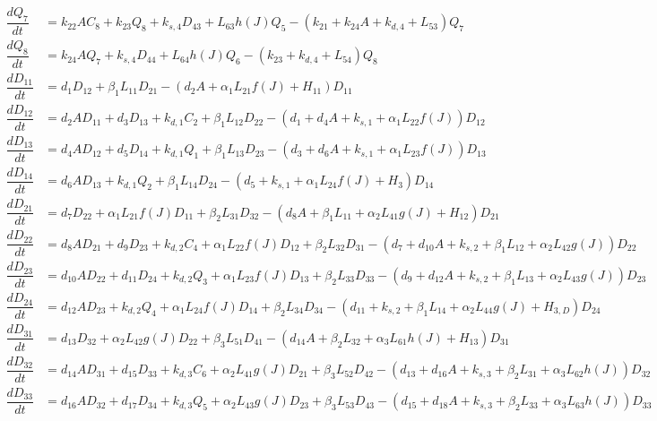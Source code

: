 \begin{align*}
\dfrac{dQ_{7}}{dt} & =k_{22}AC_{8}+k_{23}Q_{8}+k_{s,4}D_{43}+L_{63}h\left(J\right)Q_{5}-\left(k_{21}+k_{24}A+k_{d,4}+L_{53}\right)Q_{7}\\
\dfrac{dQ_{8}}{dt} & =k_{24}AQ_{7}+k_{s,4}D_{44}+L_{64}h\left(J\right)Q_{6}-\left(k_{23}+k_{d,4}+L_{54}\right)Q_{8}\\
\dfrac{dD_{11}}{dt} & =d_{1}D_{12}+\beta_{1}L_{11}D_{21}-\left(d_{2}A+\alpha_{1}L_{21}f\left(J\right)+H_{11}\right)D_{11}\\
\dfrac{dD_{12}}{dt} & =d_{2}AD_{11}+d_{3}D_{13}+k_{d,1}C_{2}+\beta_{1}L_{12}D_{22}-\left(d_{1}+d_{4}A+k_{s,1}+\alpha_{1}L_{22}f\left(J\right)\right)D_{12}\\
\dfrac{dD_{13}}{dt} & =d_{4}AD_{12}+d_{5}D_{14}+k_{d,1}Q_{1}+\beta_{1}L_{13}D_{23}-\left(d_{3}+d_{6}A+k_{s,1}+\alpha_{1}L_{23}f\left(J\right)\right)D_{13}\\
\dfrac{dD_{14}}{dt} & =d_{6}AD_{13}+k_{d,1}Q_{2}+\beta_{1}L_{14}D_{24}-\left(d_{5}+k_{s,1}+\alpha_{1}L_{24}f\left(J\right)+H_{3}\right)D_{14}\\
\dfrac{dD_{21}}{dt} & =d_{7}D_{22}+\alpha_{1}L_{21}f\left(J\right)D_{11}+\beta_{2}L_{31}D_{32}-\left(d_{8}A+\beta_{1}L_{11}+\alpha_{2}L_{41}g\left(J\right)+H_{12}\right)D_{21}\\
\dfrac{dD_{22}}{dt} & =d_{8}AD_{21}+d_{9}D_{23}+k_{d,2}C_{4}+\alpha_{1}L_{22}f\left(J\right)D_{12}+\beta_{2}L_{32}D_{31}-\left(d_{7}+d_{10}A+k_{s,2}+\beta_{1}L_{12}+\alpha_{2}L_{42}g\left(J\right)\right)D_{22}\\
\dfrac{dD_{23}}{dt} & =d_{10}AD_{22}+d_{11}D_{24}+k_{d,2}Q_{3}+\alpha_{1}L_{23}f\left(J\right)D_{13}+\beta_{2}L_{33}D_{33}-\left(d_{9}+d_{12}A+k_{s,2}+\beta_{1}L_{13}+\alpha_{2}L_{43}g\left(J\right)\right)D_{23}\\
\dfrac{dD_{24}}{dt} & =d_{12}AD_{23}+k_{d,2}Q_{4}+\alpha_{1}L_{24}f\left(J\right)D_{14}+\beta_{2}L_{34}D_{34}-\left(d_{11}+k_{s,2}+\beta_{1}L_{14}+\alpha_{2}L_{44}g\left(J\right)+H_{3,D}\right)D_{24}\\
\dfrac{dD_{31}}{dt} & =d_{13}D_{32}+\alpha_{2}L_{42}g\left(J\right)D_{22}+\beta_{3}L_{51}D_{41}-\left(d_{14}A+\beta_{2}L_{32}+\alpha_{3}L_{61}h\left(J\right)+H_{13}\right)D_{31}\\
\dfrac{dD_{32}}{dt} & =d_{14}AD_{31}+d_{15}D_{33}+k_{d,3}C_{6}+\alpha_{2}L_{41}g\left(J\right)D_{21}+\beta_{3}L_{52}D_{42}-\left(d_{13}+d_{16}A+k_{s,3}+\beta_{2}L_{31}+\alpha_{3}L_{62}h\left(J\right)\right)D_{32}\\
\dfrac{dD_{33}}{dt} & =d_{16}AD_{32}+d_{17}D_{34}+k_{d,3}Q_{5}+\alpha_{2}L_{43}g\left(J\right)D_{23}+\beta_{3}L_{53}D_{43}-\left(d_{15}+d_{18}A+k_{s,3}+\beta_{2}L_{33}+\alpha_{3}L_{63}h\left(J\right)\right)D_{33}\\

\end{align*}
